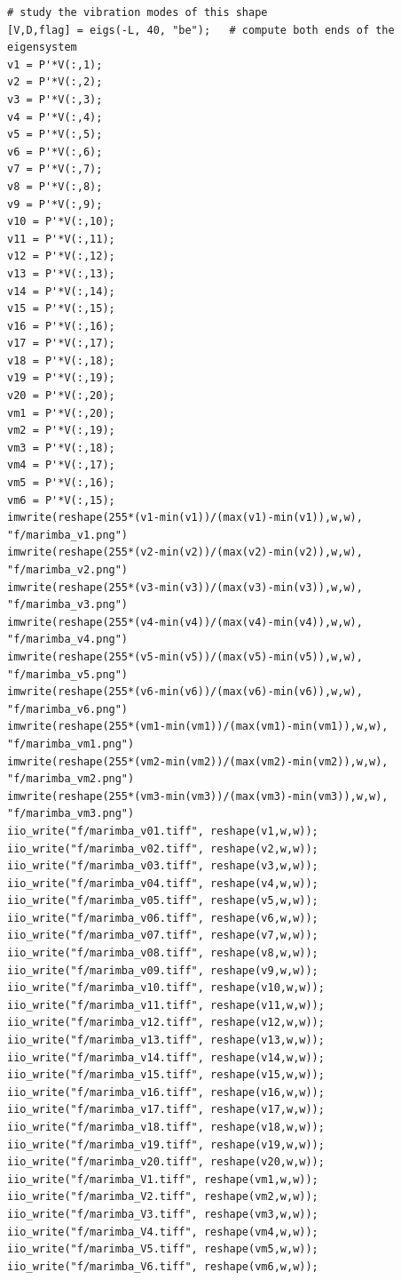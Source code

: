 \documentclass[a4paper,11pt]{article}
\begin{document}
\begin{verbatim}
# study the vibration modes of this shape
[V,D,flag] = eigs(-L, 40, "be");   # compute both ends of the eigensystem
v1 = P'*V(:,1);
v2 = P'*V(:,2);
v3 = P'*V(:,3);
v4 = P'*V(:,4);
v5 = P'*V(:,5);
v6 = P'*V(:,6);
v7 = P'*V(:,7);
v8 = P'*V(:,8);
v9 = P'*V(:,9);
v10 = P'*V(:,10);
v11 = P'*V(:,11);
v12 = P'*V(:,12);
v13 = P'*V(:,13);
v14 = P'*V(:,14);
v15 = P'*V(:,15);
v16 = P'*V(:,16);
v17 = P'*V(:,17);
v18 = P'*V(:,18);
v19 = P'*V(:,19);
v20 = P'*V(:,20);
vm1 = P'*V(:,20);
vm2 = P'*V(:,19);
vm3 = P'*V(:,18);
vm4 = P'*V(:,17);
vm5 = P'*V(:,16);
vm6 = P'*V(:,15);
imwrite(reshape(255*(v1-min(v1))/(max(v1)-min(v1)),w,w), "f/marimba_v1.png")
imwrite(reshape(255*(v2-min(v2))/(max(v2)-min(v2)),w,w), "f/marimba_v2.png")
imwrite(reshape(255*(v3-min(v3))/(max(v3)-min(v3)),w,w), "f/marimba_v3.png")
imwrite(reshape(255*(v4-min(v4))/(max(v4)-min(v4)),w,w), "f/marimba_v4.png")
imwrite(reshape(255*(v5-min(v5))/(max(v5)-min(v5)),w,w), "f/marimba_v5.png")
imwrite(reshape(255*(v6-min(v6))/(max(v6)-min(v6)),w,w), "f/marimba_v6.png")
imwrite(reshape(255*(vm1-min(vm1))/(max(vm1)-min(vm1)),w,w), "f/marimba_vm1.png")
imwrite(reshape(255*(vm2-min(vm2))/(max(vm2)-min(vm2)),w,w), "f/marimba_vm2.png")
imwrite(reshape(255*(vm3-min(vm3))/(max(vm3)-min(vm3)),w,w), "f/marimba_vm3.png")
iio_write("f/marimba_v01.tiff", reshape(v1,w,w));
iio_write("f/marimba_v02.tiff", reshape(v2,w,w));
iio_write("f/marimba_v03.tiff", reshape(v3,w,w));
iio_write("f/marimba_v04.tiff", reshape(v4,w,w));
iio_write("f/marimba_v05.tiff", reshape(v5,w,w));
iio_write("f/marimba_v06.tiff", reshape(v6,w,w));
iio_write("f/marimba_v07.tiff", reshape(v7,w,w));
iio_write("f/marimba_v08.tiff", reshape(v8,w,w));
iio_write("f/marimba_v09.tiff", reshape(v9,w,w));
iio_write("f/marimba_v10.tiff", reshape(v10,w,w));
iio_write("f/marimba_v11.tiff", reshape(v11,w,w));
iio_write("f/marimba_v12.tiff", reshape(v12,w,w));
iio_write("f/marimba_v13.tiff", reshape(v13,w,w));
iio_write("f/marimba_v14.tiff", reshape(v14,w,w));
iio_write("f/marimba_v15.tiff", reshape(v15,w,w));
iio_write("f/marimba_v16.tiff", reshape(v16,w,w));
iio_write("f/marimba_v17.tiff", reshape(v17,w,w));
iio_write("f/marimba_v18.tiff", reshape(v18,w,w));
iio_write("f/marimba_v19.tiff", reshape(v19,w,w));
iio_write("f/marimba_v20.tiff", reshape(v20,w,w));
iio_write("f/marimba_V1.tiff", reshape(vm1,w,w));
iio_write("f/marimba_V2.tiff", reshape(vm2,w,w));
iio_write("f/marimba_V3.tiff", reshape(vm3,w,w));
iio_write("f/marimba_V4.tiff", reshape(vm4,w,w));
iio_write("f/marimba_V5.tiff", reshape(vm5,w,w));
iio_write("f/marimba_V6.tiff", reshape(vm6,w,w));
\end{verbatim}
\end{document}

